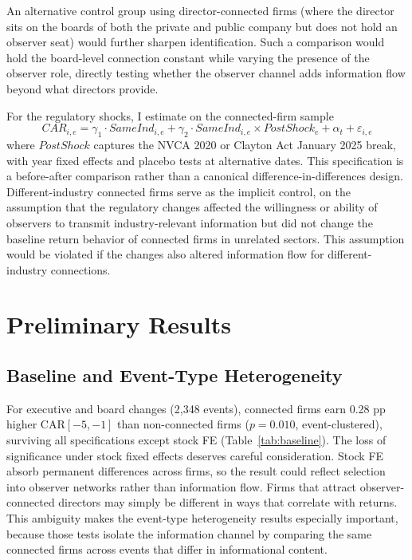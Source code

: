 \documentclass[12pt]{article}
\begin{document}
An alternative control group using director-connected firms (where the director sits on the boards of both the private and public company but does not hold an observer seat) would further sharpen identification. Such a comparison would hold the board-level connection constant while varying the presence of the observer role, directly testing whether the observer channel adds information flow beyond what directors provide.

For the regulatory shocks, I estimate on the connected-firm sample
\begin{equation}
\label{eq:nvca}
CAR_{i,e} = \gamma_1 \cdot SameInd_{i,e} + \gamma_2 \cdot SameInd_{i,e} \times PostShock_e + \alpha_t + \varepsilon_{i,e}
\end{equation}
where $PostShock$ captures the NVCA 2020 or Clayton Act January 2025 break, with year fixed effects and placebo tests at alternative dates. This specification is a before-after comparison rather than a canonical difference-in-differences design. Different-industry connected firms serve as the implicit control, on the assumption that the regulatory changes affected the willingness or ability of observers to transmit industry-relevant information but did not change the baseline return behavior of connected firms in unrelated sectors. This assumption would be violated if the changes also altered information flow for different-industry connections.



\section{Preliminary Results}
\label{sec:results}

\subsection{Baseline and Event-Type Heterogeneity}



For executive and board changes (2,348 events), connected firms earn 0.28 pp higher CAR$[-5,-1]$ than non-connected firms ($p=0.010$, event-clustered), surviving all specifications except stock FE (Table~\ref{tab:baseline}). The loss of significance under stock fixed effects deserves careful consideration. Stock FE absorb permanent differences across firms, so the result could reflect selection into observer networks rather than information flow. Firms that attract observer-connected directors may simply be different in ways that correlate with returns. This ambiguity makes the event-type heterogeneity results especially important, because those tests isolate the information channel by comparing the same connected firms across events that differ in informational content.
\end{document}
